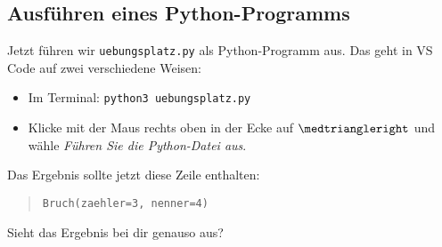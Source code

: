 \subsection*{Ausführen eines Python-Programms}

Jetzt führen wir \texttt{uebungsplatz.py} als Python-Programm aus. Das geht in VS Code auf zwei verschiedene Weisen:

\begin{itemize}
	\item Im Terminal: \texttt{python3 uebungsplatz.py}
	\item Klicke mit der Maus rechts oben in der Ecke auf $\medtriangleright$ und wähle \textit{Führen Sie die Python-Datei aus}.
\end{itemize}


Das Ergebnis sollte jetzt diese Zeile enthalten:
\begin{quote}
\texttt{Bruch(zaehler=3, nenner=4)}
\end{quote}

Sieht das Ergebnis bei dir genauso aus?

